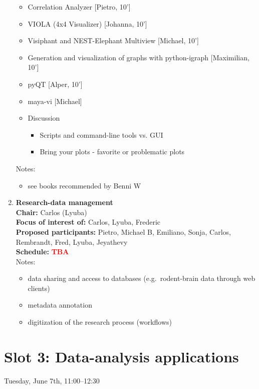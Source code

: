 \documentclass[10pt, a4paper,twoside,american]{article}
\newcommand{\alert}[1]{\textcolor{red}{\bf #1}}
\begin{document}
\begin{enumerate}[resume]
\begin{itemize}
  \item Correlation Analyzer [Pietro, 10']
  \item VIOLA (4x4 Visualizer) [Johanna, 10']
  \item Visiphant and NEST-Elephant Multiview [Michael, 10']
  \item Generation and visualization of graphs with python-igraph [Maximilian, 10']
  \item pyQT [Alper, 10']
  \item maya-vi [Michael]
  \item Discussion
    \begin{itemize}
    \item Scripts and command-line tools vs. GUI
    \item Bring your plots - favorite or problematic plots
    \end{itemize}
  \end{itemize}
  Notes:
  \begin{itemize}
  \item see books recommended by Benni W
  \end{itemize}
\item {\large\bf Research-data management}\\[1ex]
  {\bf Chair:} Carlos (Lyuba)\\[1ex]
  {\bf Focus of interest of:} Carlos, Lyuba, Frederic\\[1ex]
  {\bf Proposed participants:} Pietro, Michael B, Emiliano, Sonja, Carlos, Rembrandt, Fred, Lyuba, Jeyathevy\\[1ex]
  {\bf Schedule:} \alert{TBA}\\[1ex]
  Notes:
  \begin{itemize}
  \item data sharing and access to databases (e.g.~rodent-brain data through web clients)
  \item metadata annotation
  \item digitization of the research process (workflows)
  \end{itemize}
\end{enumerate}

\section*{Slot 3: Data-analysis applications}
Tuesday, June 7th, 11:00--12:30
\end{document}

